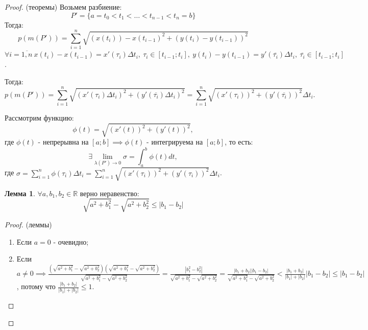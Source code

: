 \documentclass{report}
\theoremstyle{definition}
\newtheorem{lemma}{Лемма}[section]
\begin{document}
\begin{proof}
  (теоремы) Возьмем разбиение:
  \begin{equation*}
    P' = \{a=t_0<t_1<\ldots<t_{n-1}<t_n=b\}
  \end{equation*}
  Тогда:
  \begin{equation*}
    p(m(P')) = \sum_{i=1}^{n} \sqrt{(x(t_i)) - x(t_{i-1})^2 + (y(t_i) - y(t_{i-1}))^2}
  \end{equation*}
  $\forall i = \overline{1,n} \ x(t_i) - x(t_{i-1}) = x'(\tau_i)\Delta t_i, \ \tau_i\in[t_{i-1};t_i], \
  y(t_i) - y(t_{i-1}) = y'(\overline{\tau_i})\Delta t_i, \ \overline{\tau_i}\in[t_{i-1};t_i]$.

  Тогда:
  \begin{equation*}
    p(m(P')) = \sum_{i=1}^{n}\sqrt{(x'(\tau_i)\Delta t_i)^2 + (y'(\overline{\tau_i})\Delta t_i)^2} =
  \sum_{i=1}^{n}\sqrt{(x'(\tau_i))^2 + (y'(\overline{\tau_i}))^2}\Delta t_i.
  \end{equation*}

  Рассмотрим функцию:
  \begin{equation*}
    \phi(t) = \sqrt{(x'(t))^2 + (y'(t))^2},
  \end{equation*}
  где $\phi(t)$ - непрерывна на $[a;b] \implies \phi(t)$ - интегрируема на $[a;b]$, то есть:
  \begin{equation*}
    \exists \underset{\lambda(P')\rightarrow0}{\lim}\sigma = \int_{a}^{b}\phi(t)dt,
  \end{equation*}
  где $\sigma = \sum_{i=1}^{n}\phi(\tau_i)\Delta t_i = \sum_{i=1}^{n}\sqrt{(x'(\tau_i))^2 +
  (y'(\tau_i))^2}\Delta t_i$.

  \begin{lemma}
    $\forall a,b_1,b_2\in\mathbb{R}$ верно неравенство:
    \begin{equation*}
      \sqrt{a^2 + b_1^2} - \sqrt{a^2 + b_2^2} \leqslant | b_1 - b_2 |
    \end{equation*}
  \end{lemma}

  \begin{proof}
    (леммы)
    
    \begin{enumerate}
      \item Если $a=0$ - очевидно;
      \item Если $a\ne0 \implies \frac{(\sqrt{a^2 + b_1^2} - \sqrt{a^2 + b_2^2})
      (\sqrt{a^2 + b_1^2} - \sqrt{a^2 + b_2^2})}{\sqrt{a^2 + b_1^2} - \sqrt{a^2 + b_2^2}} = 
      \frac{| b_1^2 - b_2^2 |}{\sqrt{a^2 + b_1^2} - \sqrt{a^2 + b_2^2}} = 
      \frac{| b_1 + b_2 | | b_1 - b_2 |}{\sqrt{a^2 + b_1^2} - \sqrt{a^2 + b_2^2}} <
      \frac{| b_1 + b_2 |}{| b_1 | + | b_2 |}| b_1 - b_2 | \leqslant | b_1 - b_2 |$, потому что
      $\frac{| b_1 + b_2 |}{| b_1 | + | b_2 |} \leqslant 1$.
    \end{enumerate}
  \end{proof}


\end{proof}
\end{document}
